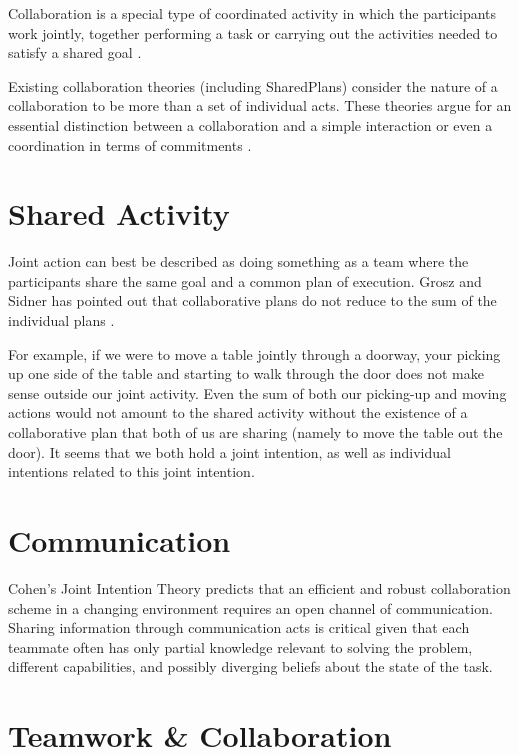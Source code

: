 \documentclass[11pt]{article}
\begin{document}
Collaboration is a special type of coordinated activity in which the
participants work jointly, together performing a task or carrying out the
activities needed to satisfy a shared goal \cite{grosz:collaboration}.

Existing collaboration theories (including SharedPlans) consider the nature of a
collaboration to be more than a set of individual acts. These theories argue for
an essential distinction between a collaboration and a simple interaction or
even a coordination in terms of commitments \cite{grosz:shared-plans,
lochbaum:collaborative-planning}.

\section{Shared Activity}

Joint action can best be described as doing something as a team where the
participants share the same goal and a common plan of execution. Grosz and
Sidner has pointed out that collaborative plans do not reduce to the sum of the
individual plans \cite{grosz:plans-discourse}
\cite{grosz:collaborative-systems}.

For example, if we were to move a table jointly through a doorway, your picking
up one side of the table and starting to walk through the door does not make
sense outside our joint activity. Even the sum of both our picking-up and moving
actions would not amount to the shared activity without the existence of a
collaborative plan that both of us are sharing (namely to move the table out the
door). It seems that we both hold a joint intention, as well as individual
intentions related to this joint intention.

\section{Communication}

Cohen’s Joint Intention Theory predicts that an efficient and robust
collaboration scheme in a changing environment requires an open channel of
communication. Sharing information through communication acts is critical given
that each teammate often has only partial knowledge relevant to solving the
problem, different capabilities, and possibly diverging beliefs about the state
of the task.

\section{Teamwork \& Collaboration}
\end{document}
